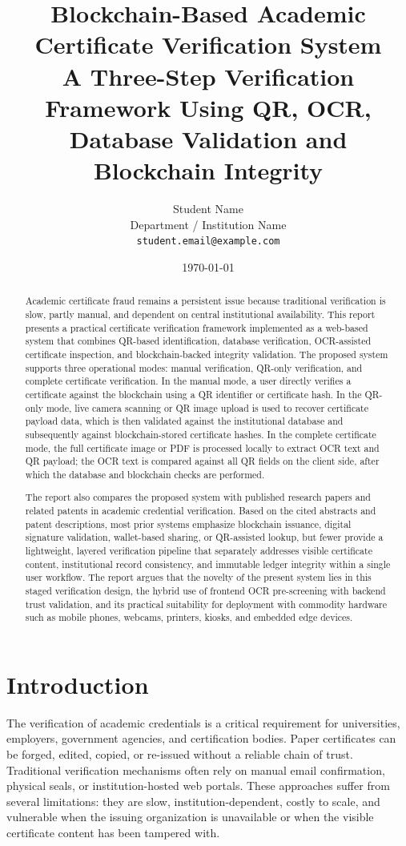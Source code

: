 \documentclass[12pt,a4paper]{article}
\title{\textbf{Blockchain-Based Academic Certificate Verification System}\\
\large A Three-Step Verification Framework Using QR, OCR, Database Validation and Blockchain Integrity}
\author{
Student Name \\
Department / Institution Name \\
\texttt{student.email@example.com}
}
\date{\today}
\begin{document}
\maketitle
\thispagestyle{empty}

\begin{abstract}
Academic certificate fraud remains a persistent issue because traditional verification is slow, partly manual, and dependent on central institutional availability. This report presents a practical certificate verification framework implemented as a web-based system that combines QR-based identification, database verification, OCR-assisted certificate inspection, and blockchain-backed integrity validation. The proposed system supports three operational modes: manual verification, QR-only verification, and complete certificate verification. In the manual mode, a user directly verifies a certificate against the blockchain using a QR identifier or certificate hash. In the QR-only mode, live camera scanning or QR image upload is used to recover certificate payload data, which is then validated against the institutional database and subsequently against blockchain-stored certificate hashes. In the complete certificate mode, the full certificate image or PDF is processed locally to extract OCR text and QR payload; the OCR text is compared against all QR fields on the client side, after which the database and blockchain checks are performed.

The report also compares the proposed system with published research papers and related patents in academic credential verification. Based on the cited abstracts and patent descriptions, most prior systems emphasize blockchain issuance, digital signature validation, wallet-based sharing, or QR-assisted lookup, but fewer provide a lightweight, layered verification pipeline that separately addresses visible certificate content, institutional record consistency, and immutable ledger integrity within a single user workflow. The report argues that the novelty of the present system lies in this staged verification design, the hybrid use of frontend OCR pre-screening with backend trust validation, and its practical suitability for deployment with commodity hardware such as mobile phones, webcams, printers, kiosks, and embedded edge devices.
\end{abstract}

\newpage
\tableofcontents
\newpage

\section{Introduction}
The verification of academic credentials is a critical requirement for universities, employers, government agencies, and certification bodies. Paper certificates can be forged, edited, copied, or re-issued without a reliable chain of trust. Traditional verification mechanisms often rely on manual email confirmation, physical seals, or institution-hosted web portals. These approaches suffer from several limitations: they are slow, institution-dependent, costly to scale, and vulnerable when the issuing organization is unavailable or when the visible certificate content has been tampered with.
\end{document}
